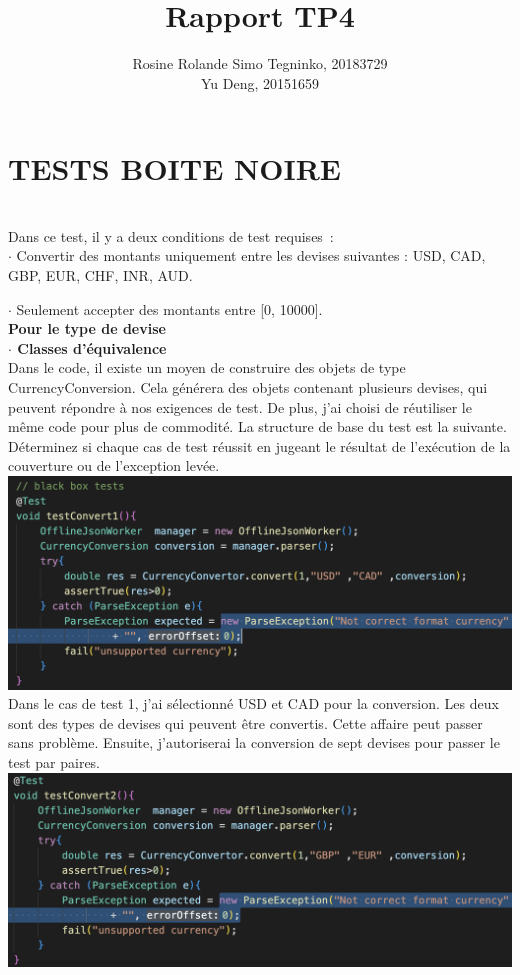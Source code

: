 \documentclass{article}
\title{Rapport TP4}
\author{Rosine Rolande Simo Tegninko, 20183729\\
Yu Deng, 20151659}
\date{}
\begin{document}
\maketitle

\section*{TESTS BOITE NOIRE}\\

Dans ce test, il y a deux conditions de test requises :\\

$\cdot$ Convertir des montants uniquement entre les devises suivantes : USD, CAD, GBP, EUR, CHF, INR, AUD.

$\cdot$ Seulement accepter des montants entre [0, 10000].\\

\textbf{Pour le type de devise}\\

\textbf{$\cdot$ Classes d'équivalence}\\


Dans le code, il existe un moyen de construire des objets de type CurrencyConversion. Cela générera des objets contenant plusieurs devises, qui peuvent répondre à nos exigences de test. De plus, j'ai choisi de réutiliser le même code pour plus de commodité. La structure de base du test est la suivante. Déterminez si chaque cas de test réussit en jugeant le résultat de l'exécution de la couverture ou de l'exception levée.\\
\includegraphics[scale=0.3]{G1.png}\\

Dans le cas de test 1, j'ai sélectionné USD et CAD pour la conversion. Les deux sont des types de devises qui peuvent être convertis. Cette affaire peut passer sans problème. Ensuite, j'autoriserai la conversion de sept devises pour passer le test par paires.\\
\includegraphics[scale=0.3]{G2.png}\\
\end{document}
